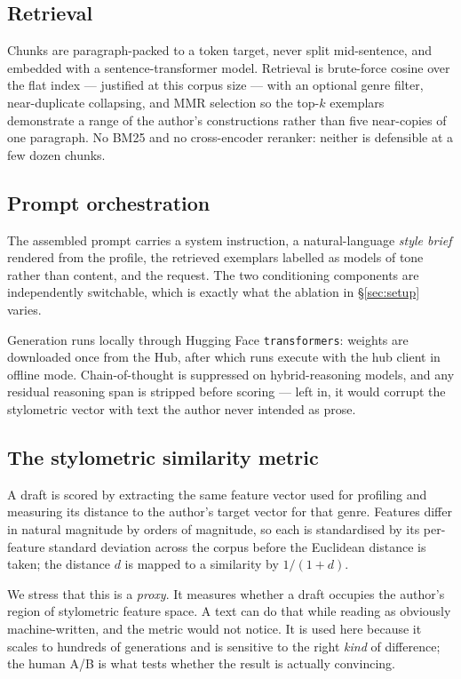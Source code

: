 \documentclass[11pt]{article}
\begin{document}
\subsection{Retrieval}
\label{sec:retrieval}

Chunks are paragraph-packed to a token target, never split mid-sentence, and
embedded with a sentence-transformer model. Retrieval is brute-force cosine over
the flat index --- justified at this corpus size --- with an optional genre
filter, near-duplicate collapsing, and MMR selection so the top-$k$ exemplars
demonstrate a range of the author's constructions rather than five near-copies of
one paragraph. No BM25 and no cross-encoder reranker: neither is defensible at a
few dozen chunks.

\subsection{Prompt orchestration}
\label{sec:prompting}

The assembled prompt carries a system instruction, a natural-language
\emph{style brief} rendered from the profile, the retrieved exemplars labelled as
models of tone rather than content, and the request. The two conditioning
components are independently switchable, which is exactly what the ablation in
\S\ref{sec:setup} varies.

Generation runs locally through Hugging Face \texttt{transformers}: weights are
downloaded once from the Hub, after which runs execute with the hub client in
offline mode. Chain-of-thought is suppressed on hybrid-reasoning models, and any
residual reasoning span is stripped before scoring --- left in, it would corrupt
the stylometric vector with text the author never intended as prose.

\subsection{The stylometric similarity metric}
\label{sec:metric}

A draft is scored by extracting the same feature vector used for profiling and
measuring its distance to the author's target vector for that genre. Features
differ in natural magnitude by orders of magnitude, so each is standardised by
its per-feature standard deviation across the corpus before the Euclidean
distance is taken; the distance $d$ is mapped to a similarity by $1/(1+d)$.

We stress that this is a \emph{proxy}. It measures whether a draft occupies the
author's region of stylometric feature space. A text can do that while reading
as obviously machine-written, and the metric would not notice. It is used here
because it scales to hundreds of generations and is sensitive to the right
\emph{kind} of difference; the human A/B is what tests whether the result is
actually convincing.
\end{document}
